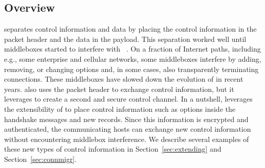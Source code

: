 \subsection{Overview}

\tcp separates control information and data by placing the control information in
the packet header and the data in the payload. This separation worked well until
middleboxes started to interfere with \tcp~\cite{10.1145/1064413.1064418,
honda2011still, DHBVD13}.  On a fraction of Internet paths, including e.g.,
some enterprise and cellular networks, some middleboxes interfere by adding,
removing, or changing \tcp options \cite{wang2011untold, honda2011still, xu2015investigating} and, in some cases, also
transparently terminating \tcp connections. These middleboxes have slowed down
the evolution of \tcp in recent years. \tcpls also uses the packet header to
exchange \tcp control information, but it leverages \tls to create a second and
secure control channel. In a nutshell, \tcpls leverages the extensibility of  to place control information such as \tcp options inside the \tls handshake
messages and new \tls records. Since this information is encrypted and
authenticated, the communicating hosts can exchange new control information
without encountering middlebox interference. We describe several examples of these new
types of control information in Section~\ref{sec:extending} and
Section~\ref{sec:connmigr}.






